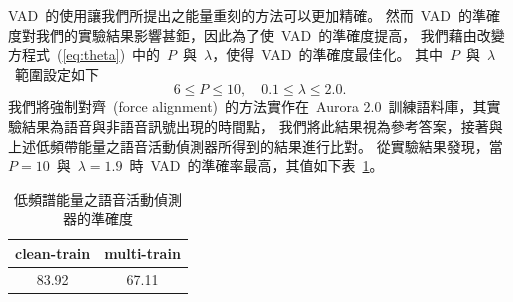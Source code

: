 VAD~的使用讓我們所提出之能量重刻的方法可以更加精確。
然而~VAD~的準確度對我們的實驗結果影響甚鉅，因此為了使~VAD~的準確度提高，
我們藉由改變方程式~(\ref{eq:theta})~中的~$P$~與~$\lambda$，使得~VAD~的準確度最佳化。
其中~$P$~與~$\lambda$~範圍設定如下
\[
	6 \leq P \leq 10, \quad 0.1 \leq \lambda \leq 2.0 .
\]
我們將強制對齊~(force alignment)~的方法實作在~Aurora 2.0~訓練語料庫，其實驗結果為語音與非語音訊號出現的時間點，
我們將此結果視為參考答案，接著與上述低頻帶能量之語音活動偵測器所得到的結果進行比對。
從實驗結果發現，當~$P = 10$~與~$\lambda = 1.9$~時~VAD~的準確率最高，其值如下表~\ref{table:vad_acc}。

\begin{table}[!htb]
\renewcommand{\arraystretch}{1.1}
\centering
\caption{低頻譜能量之語音活動偵測器的準確度}
\label{table:vad_acc}  
\vspace{2mm}
\begin{tabular}{cc}
\hline 
clean-train & multi-train  \\ 
\hline
{83.92} & {67.11}  \\
\hline
\end{tabular}
\end{table}



